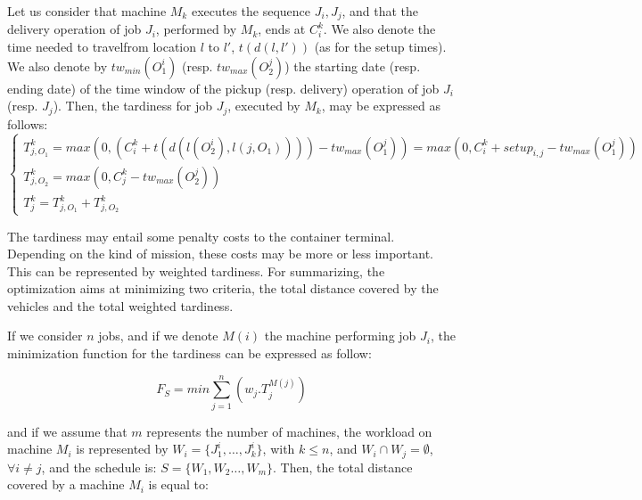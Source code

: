 \documentclass[a4paper,12pt]{article}
\begin{document}
Let us consider that machine $M_k$ executes the sequence $J_i,J_j$, and that the delivery operation of job $J_i$, performed by $M_k$, ends at $C^k_i$. We also denote the time needed to travelfrom location $l$ to $l'$, $t(d(l,l'))$ (as for the setup times). We also denote by $tw_{min}(O^i_1)$ (resp. $tw_{max}(O^j_2)$) the starting date (resp. ending date) of the time window of the pickup (resp. delivery) operation of job $J_i$ (resp. $J_j$). Then, the tardiness for job $J_j$, executed by $M_k$, may be expressed as follows: 
\begin{equation*}
 \begin{cases}
    T^k_{j,O_1} = max(0, (C^k_i + t(d(l(O^i_2),l(j, O_1)))) - tw_{max}(O^j_1)) = max(0,C^k_i+setup_{i,j}-tw_{max}(O^j_1))\\
    T^k_{j,O_2} = max(0 ,C^k_j - tw_{max}(O^j_2))\\
    T^k_{j} = T^k_{j,O_1} + T^k_{j,O_2}
\end{cases}
\end{equation*}

The tardiness may entail some penalty costs to the container terminal. Depending on the kind of mission, these costs may be more or less important. This can be represented by weighted tardiness. For summarizing, the optimization aims at minimizing two criteria, the total distance covered by the vehicles and the total weighted tardiness. 

If we consider $n$ jobs, and if we denote $M(i)$ the machine performing job $J_i$, the minimization function for the tardiness can be expressed as follow:

\begin{equation*}
    F_S = min \sum_{j=1}^{n}(w_j.T^{M(j)}_{j})
\end{equation*}
 

and if we assume that $m$ represents the number of machines, the workload on machine $M_i$ is represented by  $W_{i} = \{ J^i_1 , \ldots , J^i_k \}$, with $k \leq n$, and $W_{i} \cap W_{j} = \emptyset$,  $\forall i \neq j$, and the schedule is: $S = \{ W_{1} , W_{2} \ldots , W_{m}\}$. Then, the total distance covered by a machine $M_i$ is equal to: 
\end{document}
